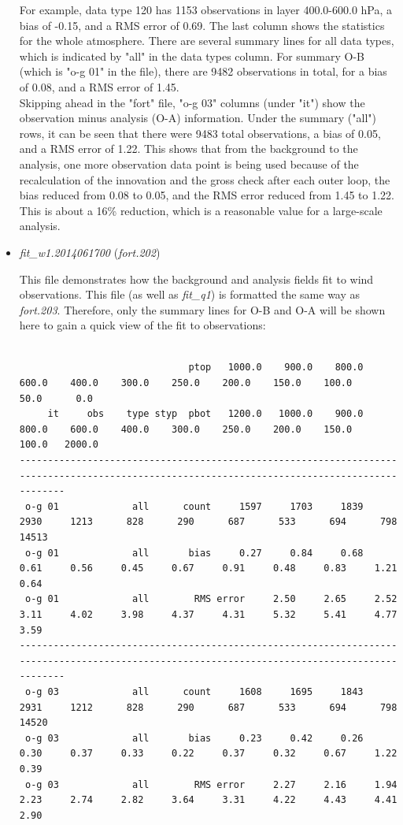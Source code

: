 \begin{itemize}[leftmargin=*]
For example, data type 120 has 1153 observations in layer 400.0-600.0 hPa, a bias of -0.15, and a RMS error of 0.69. The last column shows the statistics for the whole atmosphere. There are several summary lines for all data types, which is indicated by "all" in the data types column.  For summary O-B (which is "o-g 01" in the file), there are 9482 observations in total, for a bias of 0.08, and a RMS error of 1.45. \\

 Skipping ahead in the "fort" file, "o-g 03" columns (under "it") show the observation minus analysis (O-A) information.  Under the summary ("all") rows, it can be seen that there were 9483 total observations, a bias of 0.05, and a RMS error of 1.22.  This shows that from the background to the analysis, one more observation data point is being used because of the recalculation of the innovation and the gross check after each outer loop, the bias reduced from 0.08 to 0.05, and the RMS error reduced from 1.45 to 1.22.  This is about a 16\% reduction, which is a reasonable value for a large-scale analysis. \\
 

\item \textit{fit\_w1.2014061700} (\textit{fort.202})

This file demonstrates how the background and analysis fields fit to wind observations.  This file (as well as \textit{fit\_q1}) is formatted the same way as \textit{fort.203}.  Therefore, only the summary lines for O-B and O-A will be shown here to gain a quick view of the fit to observations:

\begin{tiny}
\begin{verbatim}

                              ptop   1000.0    900.0    800.0    600.0    400.0    300.0    250.0    200.0    150.0    100.0     50.0      0.0
     it     obs    type styp  pbot   1200.0   1000.0    900.0    800.0    600.0    400.0    300.0    250.0    200.0    150.0    100.0   2000.0
----------------------------------------------------------------------------------------------------------------------------------------------
 o-g 01             all      count     1597     1703     1839     2930     1213      828      290      687      533      694      798    14513
 o-g 01             all       bias     0.27     0.84     0.68     0.61     0.56     0.45     0.67     0.91     0.48     0.83     1.21     0.64
 o-g 01             all        RMS error     2.50     2.65     2.52     3.11     4.02     3.98     4.37     4.31     5.32     5.41     4.77     3.59
----------------------------------------------------------------------------------------------------------------------------------------------
 o-g 03             all      count     1608     1695     1843     2931     1212      828      290      687      533      694      798    14520
 o-g 03             all       bias     0.23     0.42     0.26     0.30     0.37     0.33     0.22     0.37     0.32     0.67     1.22     0.39
 o-g 03             all        RMS error     2.27     2.16     1.94     2.23     2.74     2.82     3.64     3.31     4.22     4.43     4.41     2.90


\end{verbatim}
\end{tiny}
\end{itemize}
